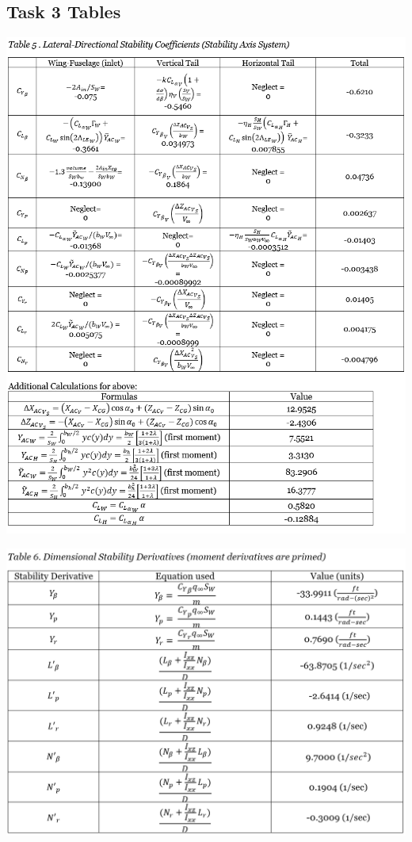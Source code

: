 \documentclass[a4paper, twoside]{article}
\begin{document}
\subsection{Task 3 Tables}
\begin{center}
\includegraphics[width=\linewidth]{table-5.png}
\end{center}
\pagebreak
\begin{center}
\includegraphics[width=\linewidth]{table-6.png}
\end{center}
\end{document}
